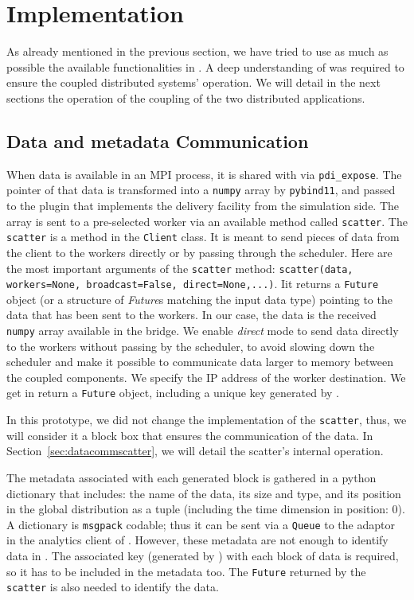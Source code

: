 \section{Implementation}
As already mentioned in the previous section, we have tried to use as much as possible the available functionalities in \dask. A deep understanding of \dask was required to ensure the coupled distributed systems' operation. We will detail in the next sections the operation of the coupling of the two distributed applications.

\subsection{Data and metadata Communication}\label{sec:datametadacomm}

When data is available in an MPI process, it is shared with \pdi via \texttt{pdi\_expose}. The pointer of that data is transformed into a \texttt{numpy} array by \texttt{pybind11}, and passed to the \deisa plugin that implements the delivery facility from the simulation side. 
The array is sent to a pre-selected \dask worker via an available method called \texttt{scatter}. 
The \texttt{scatter} is a method in the \dask \texttt{Client} class. It is meant to send pieces of data from the client to the workers directly or by passing through the scheduler. Here are the most important arguments of the \texttt{scatter} method: 
\texttt{scatter(data, workers=None, broadcast=False, direct=None,...)}. Iit returns a \texttt{Future} object (or a structure of \textit{Future}s matching the input data type) pointing to the data that has been sent to the workers. 
In our case, the data is the received \texttt{numpy} array available in the bridge. We enable \textit{direct} mode to send data directly to the workers without passing by the scheduler, to avoid slowing down the scheduler and make it possible to communicate data larger to memory between the coupled components. We specify the IP address of the worker destination. We get in return a \texttt{Future} object, including a unique key generated by \dask.

In this prototype, we did not change the implementation of the \texttt{scatter}, thus, we will consider it a block box that ensures the communication of the data. In Section~\ref{sec:datacommscatter}, we will detail the scatter's internal operation. 

The metadata associated with each generated block is gathered in a python dictionary that includes:  the name of the data, its size and type, and its position in the global distribution as a tuple (including the time dimension in position: 0).  A dictionary is \texttt{msgpack} codable; thus it can be sent via a \texttt{Queue} to the \deisa adaptor in the analytics client of \dask. However, these metadata are not enough to identify data in \dask. The associated key (generated by \dask) with each block of data is required, so it has to be included in the metadata too. The \texttt{Future} returned by the \texttt{scatter} is also needed to identify the data.

